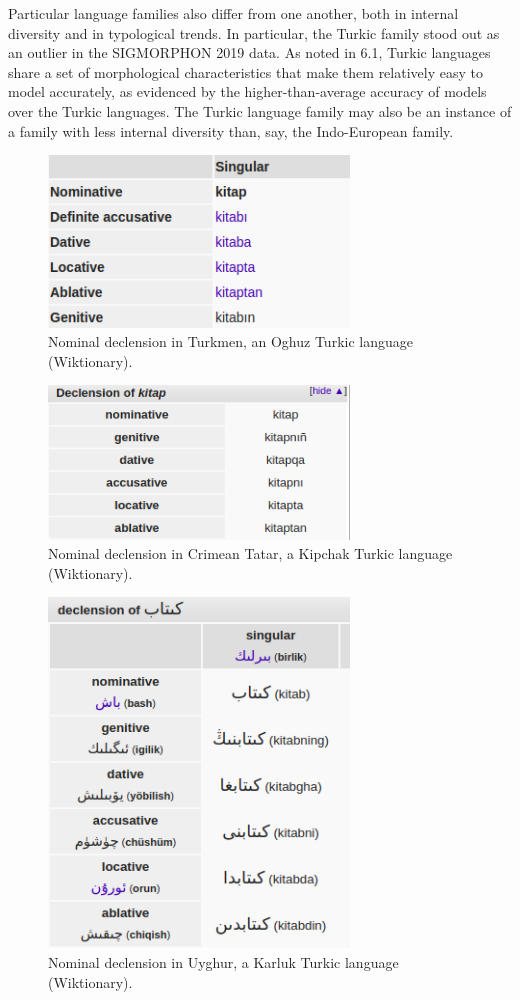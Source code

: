 Particular language families also differ from one another, both in internal diversity and in typological trends. In particular, the Turkic family stood out as an outlier in the SIGMORPHON 2019 data. As noted in 6.1, Turkic languages share a set of morphological characteristics that make them relatively easy to model accurately, as evidenced by the higher-than-average accuracy of models over the Turkic languages. The Turkic language family may also be an instance of a family with less internal diversity than, say, the Indo-European family. 

\begin{figure}[ht]
\includegraphics[width=8cm]{images/Turkish_kitap.png}
\centering
\caption{Nominal declension in Turkmen, an Oghuz Turkic language (Wiktionary).}
\end{figure}

\begin{figure}[ht]
\includegraphics[width=8cm]{images/Crimean_Tatar_kitap.png}
\centering
\caption{Nominal declension in Crimean Tatar, a Kipchak Turkic language (Wiktionary).}
\end{figure}

\begin{figure}[p]
\includegraphics[width=8cm]{images/Uyghur_kitap.png}
\centering
\caption{Nominal declension in Uyghur, a Karluk Turkic language (Wiktionary).}
\end{figure}

